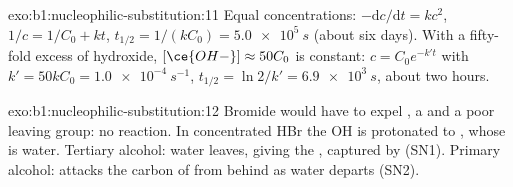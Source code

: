 \begin{solution}{exo:b1:nucleophilic-substitution:11}
Equal concentrations: $-\mathrm{d}c/\mathrm{d}t = kc^2$, $1/c = 1/C_0 + kt$,
$t_{1/2} = 1/(kC_0) = \qty{5.0e5}{s}$ (about six days). With a fifty-fold
excess of hydroxide, $[\ce{OH-}] \approx 50C_0$ is constant: $c = C_0
e^{-k't}$ with $k' = 50kC_0 = \qty{1.0e-4}{s^{-1}}$, $t_{1/2} = \ln 2/k' =
\qty{6.9e3}{s}$, about two hours.
\end{solution}

\begin{solution}{exo:b1:nucleophilic-substitution:12}
Bromide would have to expel , a  and a poor leaving
group: no reaction. In concentrated HBr the OH is protonated to
, whose  is water. Tertiary alcohol: water leaves,
giving the , captured by  (SN1). Primary alcohol:
 attacks the carbon of  from behind as water departs
(SN2).
\end{solution}

